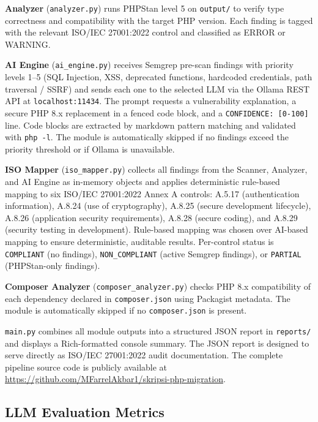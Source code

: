 \documentclass[conference]{IEEEtran}
\begin{document}
\textbf{Analyzer} (\texttt{analyzer.py}) runs PHPStan level 5
on \texttt{output/} to verify type correctness and compatibility
with the target PHP version. Each finding is tagged with the
relevant ISO/IEC 27001:2022 control and classified as ERROR or
WARNING.

\textbf{AI Engine} (\texttt{ai\_engine.py}) receives Semgrep
pre-scan findings with priority levels 1--5 (SQL Injection, XSS,
deprecated functions, hardcoded credentials, path traversal /
SSRF) and sends each one to the selected LLM via the Ollama REST
API at \texttt{localhost:11434}. The prompt requests a
vulnerability explanation, a secure PHP 8.x replacement in a
fenced code block, and a \texttt{CONFIDENCE: [0-100]} line. Code
blocks are extracted by markdown pattern matching and validated
with \texttt{php -l}. The module is automatically skipped if no
findings exceed the priority threshold or if Ollama is
unavailable.

\textbf{ISO Mapper} (\texttt{iso\_mapper.py}) collects all
findings from the Scanner, Analyzer, and AI Engine as in-memory
objects and applies deterministic rule-based mapping to six
ISO/IEC 27001:2022 Annex A controls: A.5.17 (authentication
information), A.8.24 (use of cryptography), A.8.25 (secure
development lifecycle), A.8.26 (application security
requirements), A.8.28 (secure coding), and A.8.29 (security
testing in development). Rule-based mapping was chosen over
AI-based mapping to ensure deterministic, auditable results.
Per-control status is \texttt{COMPLIANT} (no findings),
\texttt{NON\_COMPLIANT} (active Semgrep findings), or
\texttt{PARTIAL} (PHPStan-only findings).

\textbf{Composer Analyzer} (\texttt{composer\_analyzer.py})
checks PHP 8.x compatibility of each dependency declared in
\texttt{composer.json} using Packagist metadata. The module is
automatically skipped if no \texttt{composer.json} is present.

\texttt{main.py} combines all module outputs into a structured
JSON report in \texttt{reports/} and displays a Rich-formatted
console summary. The JSON report is designed to serve directly
as ISO/IEC 27001:2022 audit documentation. The complete pipeline
source code is publicly available at
\url{https://github.com/MFarrelAkbar1/skripsi-php-migration}.

\subsection{LLM Evaluation Metrics}
\end{document}
